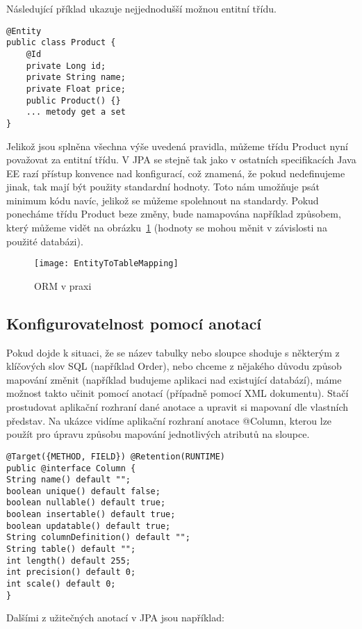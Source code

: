 \documentclass[122pt,oneside]{fithesis}
\begin{document}
Následující příklad ukazuje nejjednodušší možnou entitní třídu.

\begin{lstlisting}
@Entity
public class Product {
	@Id
	private Long id;
	private String name;
	private Float price;
	public Product() {}
	... metody get a set
}
\end{lstlisting}

Jelikož jsou splněna všechna výše uvedená pravidla, můžeme třídu Product nyní považovat za entitní třídu. V JPA se stejně tak jako v ostatních specifikacích Java EE razí přístup konvence nad konfigurací, což znamená, že pokud nedefinujeme jinak, tak mají být použity standardní hodnoty. Toto nám umožňuje psát minimum kódu navíc, jelikož se můžeme spolehnout na standardy. Pokud ponecháme třídu Product beze změny, bude namapována například způsobem, který můžeme vidět na obrázku~\ref{img:orm} (hodnoty se mohou měnit v závislosti na použité databázi).

\begin{figure}[!ht]
\centering
\texttt{[image: EntityToTableMapping]}
\caption{ORM v praxi}
\label{img:orm}
\end{figure}

\subsection{Konfigurovatelnost pomocí anotací}
Pokud dojde k situaci, že se název tabulky nebo sloupce shoduje s některým z klíčových slov SQL (například Order), nebo chceme z nějakého důvodu způsob mapování změnit (například budujeme aplikaci nad existující databází), máme možnost takto učinit pomocí anotací (případně pomocí XML dokumentu). Stačí prostudovat aplikační rozhraní dané anotace a upravit si mapovaní dle vlastních představ. Na ukázce vidíme aplikační rozhraní anotace @Column, kterou lze použít pro úpravu způsobu mapování jednotlivých atributů na sloupce.

\begin{lstlisting}
@Target({METHOD, FIELD}) @Retention(RUNTIME)
public @interface Column {
String name() default "";
boolean unique() default false;
boolean nullable() default true;
boolean insertable() default true;
boolean updatable() default true;
String columnDefinition() default "";
String table() default "";
int length() default 255;
int precision() default 0;
int scale() default 0; 
}
\end{lstlisting}

Dalšími z užitečných anotací v JPA jsou například:
\end{document}
